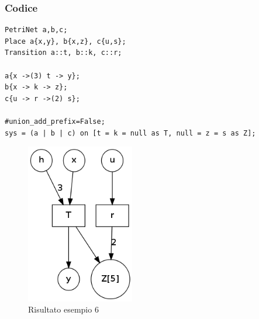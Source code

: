 \documentclass[italian,12pt]{book}
\begin{document}
\subsubsection{Codice}
\begin{verbatim}
PetriNet a,b,c;
Place a{x,y}, b{x,z}, c{u,s};
Transition a::t, b::k, c::r;

a{x ->(3) t -> y};
b{x -> k -> z};
c{u -> r ->(2) s};

#union_add_prefix=False;
sys = (a | b | c) on [t = k = null as T, null = z = s as Z];
\end{verbatim}
\begin{figure}[htb]
\centerline{\includegraphics[height=7cm]{img/unione_006.png}}
\caption{Risultato esempio 6}\label{fig:unione_006.png}
\end{figure}
\newpage
\end{document}
